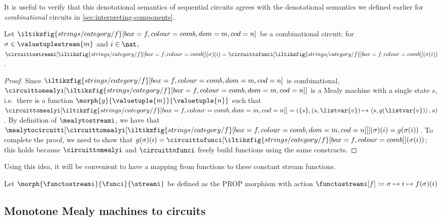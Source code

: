 \documentclass{lmcs}
\begin{document}
It is useful to verify that this denotational semantics of sequential circuits
agrees with the denotational semantics we defined earlier for
\emph{combinational} circuits in \autoref{sec:interpreting-components}.

\begin{lem}\label{lem:sequential-combinational-semantics}
    Let \(\iltikzfig{strings/category/f}[box=f,colour=comb,dom=m,cod=n]\) be
    a combinational circuit; for \(\sigma \in \valuetuplestream{m}\) and
    \(i \in \nat\), \(
    \circuittostreami[\iltikzfig{strings/category/f}[box=f,colour=comb]](\sigma)(i)
    =
    \circuittofunci[\iltikzfig{strings/category/f}[box=f,colour=comb]](\sigma(i))
    \).
\end{lem}
\begin{proof}
    Since \(\iltikzfig{strings/category/f}[box=f,colour=comb,dom=m,cod=n]\) is
    combinational, \(
    \circuittomealyi[
        \iltikzfig{strings/category/f}[box=f,colour=comb,dom=m,cod=n]
    ]
    \) is a Mealy machine with a single state \(s\), i.e.\ there is a function
    \(\morph{g}{\valuetuple{m}}{\valuetuple{n}}\) such that  \(
    \circuittomealyi[
        \iltikzfig{strings/category/f}[box=f,colour=comb,dom=m,cod=n]
    ] = (
    \{s\},
    (s, \listvar{v}) \mapsto \left\langle{s, g(\listvar{v})}\right\rangle,
    s
    )\).
    By definition of \(\mealytostreami\), we have that \(\mealytocircuiti[
        \circuittomealyi[
            \iltikzfig{strings/category/f}[box=f,colour=comb,dom=m,cod=n]
        ]
    ](\sigma)(i) = g(\sigma(i))\).
    To complete the proof, we need to show that \(
    g(\sigma)(i) =
    \circuittofunci[\iltikzfig{strings/category/f}[box=f,colour=comb]](\sigma(i))
    \); this holds because \(\circuittomealyi\) and \(\circuittofunci\) freely
    build functions using the same constructs.
\end{proof}

Using this idea, it will be convenient to have a mapping from functions to
these constant stream functions.

\begin{defi}
    Let \(\morph{\functostreami}{\funci}{\streami}\) be defined as the PROP
    morphism with action \(
    \functostreami[f] \coloneqq \sigma \mapsto i \mapsto f(\sigma)(i)
    \)
\end{defi}

\subsection{Monotone Mealy machines to circuits}
\end{document}
